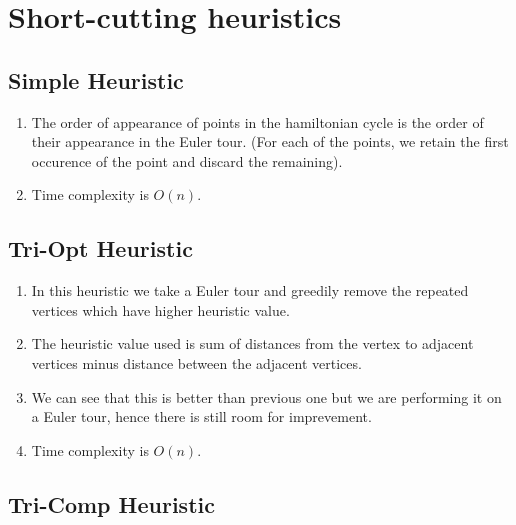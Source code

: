 \chapter{Short-cutting heuristics}


\section{Simple Heuristic}
\begin{enumerate}
    \item {The order of appearance of points in the hamiltonian cycle is the order of their appearance in the Euler tour. (For each of the points, we retain the first occurence of the point and discard the remaining).}
    \item Time complexity is $O(n)$.
\end{enumerate}

\section{Tri-Opt Heuristic}

\begin{enumerate}
    \item In this heuristic we take a Euler tour and greedily remove the repeated vertices which have higher heuristic value.
    \item The heuristic value used is sum of distances from the vertex to adjacent vertices minus distance between the adjacent vertices.
    \item We can see that this is better than previous one but we are performing it on a Euler tour, hence there is still room for imprevement.
    \item Time complexity is $O(n)$.
\end{enumerate}



\section{Tri-Comp Heuristic}

